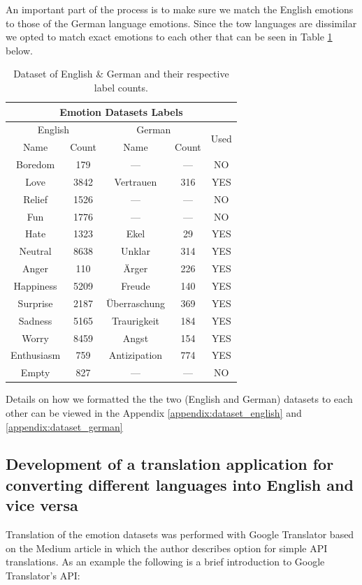 \documentclass[11pt]{article}
\begin{document}
An important part of the process is to make sure we match the English emotions to those of the German language emotions. Since the tow languages are dissimilar we opted to match exact emotions to each other that can be seen in Table \ref{table:dataset_labels} below.

\begin{table}[h!]
\centering
\begin{tabular}{ | c c | c c | c | }
    \hline
    \multicolumn{5}{|c|}{Emotion Datasets Labels} \\
    
    \hline
    \multicolumn{2}{|c|}{English} & \multicolumn{2}{|c|}{German} & \multirow{2}{*}{Used} \\
    Name & Count & Name & Count \\
    \hline
    Boredom    &  179 & ---           & --- & NO  \\
    Love       & 3842 & Vertrauen     & 316 & YES \\
    Relief     & 1526 & ---           & --- & NO  \\ 
    Fun        & 1776 & ---           & --- & NO  \\
    Hate       & 1323 & Ekel          &  29 & YES \\
    Neutral    & 8638 & Unklar        & 314 & YES \\
    Anger      &  110 & Ärger         & 226 & YES \\
    Happiness  & 5209 & Freude        & 140 & YES \\
    Surprise   & 2187 & Überraschung  & 369 & YES \\
    Sadness    & 5165 & Traurigkeit   & 184 & YES \\
    Worry      & 8459 & Angst         & 154 & YES \\
    Enthusiasm &  759 & Antizipation  & 774 & YES \\
    Empty      &  827 & ---           & --- & NO  \\
    \hline
\end{tabular}
\caption{Dataset of English \& German and their respective label counts.}
\label{table:dataset_labels}
\end{table}

Details on how we formatted the the two (English and German) datasets to each other can be viewed in the Appendix \ref{appendix:dataset_english} and \ref{appendix:dataset_german}

\subsection{Development of a translation application for converting different languages into English and vice versa}
Translation of the emotion datasets was performed with Google Translator based on the Medium article\cite{Nidhaloff_how_to_translate_text_with_python} in which the author describes option for simple API translations. As an example the following is a brief introduction to Google Translator's API:
\end{document}
